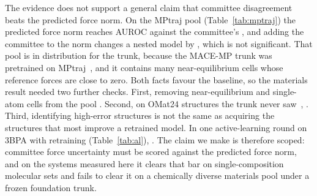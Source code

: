 The evidence does not support a general claim that committee disagreement beats
the predicted force norm. On the MPtraj pool (Table~\ref{tab:mptraj}) the
predicted force norm reaches AUROC \fsMPtrajFree against the committee's
\fsMPtrajGlobal, and adding the committee to the norm changes a nested model by
\fsCompMarginal, which is not significant. That pool is in distribution for the
trunk, because the MACE-MP trunk was pretrained on
MPtraj~\citep{batatia2023foundation,deng2023chgnet}, and it contains many
near-equilibrium cells whose reference forces are close to zero. Both facts
favour the baseline, so the materials result needed two further checks. First,
removing near-equilibrium and single-atom cells from the pool
.
Second, on OMat24 structures the trunk never saw~\citep{barrosoluque2024omat24},
.
Third, identifying high-error structures is not the same as acquiring the
structures that most improve a retrained model. In one active-learning round
on 3BPA with retraining (Table~\ref{tab:al}),
.
The claim we make is therefore scoped: committee force uncertainty must be
scored against the predicted force norm, and on the systems measured here it
clears that bar on single-composition molecular sets and fails to clear it on a
chemically diverse materials pool under a frozen foundation trunk.

